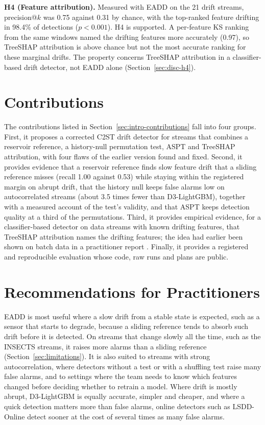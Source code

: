 \textbf{H4 (Feature attribution).} \textit{\hypHfour} Measured with EADD on the 21 drift streams, precision@$k$ was 0.75 against 0.31 by chance, with the top-ranked feature drifting in 98.4\% of detections ($p < 0.001$). H4 is supported. A per-feature KS ranking from the same windows named the drifting features more accurately (0.97), so TreeSHAP attribution is above chance but not the most accurate ranking for these marginal drifts. The property concerns TreeSHAP attribution in a classifier-based drift detector, not EADD alone (Section~\ref{sec:disc-h4}).

\section{Contributions}

The contributions listed in Section~\ref{sec:intro-contributions} fall into four groups. First, it proposes a corrected C2ST drift detector for streams that combines a reservoir reference, a history-null permutation test, ASPT and TreeSHAP attribution, with four flaws of the earlier version found and fixed. Second, it provides evidence that a reservoir reference finds slow feature drift that a sliding reference misses (recall 1.00 against 0.53) while staying within the registered margin on abrupt drift, that the history null keeps false alarms low on autocorrelated streams (about 3.5 times fewer than D3-LightGBM), together with a measured account of the test's validity, and that ASPT keeps detection quality at a third of the permutations. Third, it provides empirical evidence, for a classifier-based detector on data streams with known drifting features, that TreeSHAP attribution names the drifting features; the idea had earlier been shown on batch data in a practitioner report \citep{Maggio2021}. Finally, it provides a registered and reproducible evaluation whose code, raw runs and plans are public.

\section{Recommendations for Practitioners}

EADD is most useful where a slow drift from a stable state is expected, such as a sensor that starts to degrade, because a sliding reference tends to absorb such drift before it is detected. On streams that change slowly all the time, such as the INSECTS streams, it raises more alarms than a sliding reference (Section~\ref{sec:limitations}). It is also suited to streams with strong autocorrelation, where detectors without a test or with a shuffling test raise many false alarms, and to settings where the team needs to know which features changed before deciding whether to retrain a model. Where drift is mostly abrupt, D3-LightGBM is equally accurate, simpler and cheaper, and where a quick detection matters more than false alarms, online detectors such as LSDD-Online \citep{CobbSequential2022} detect sooner at the cost of several times as many false alarms.

